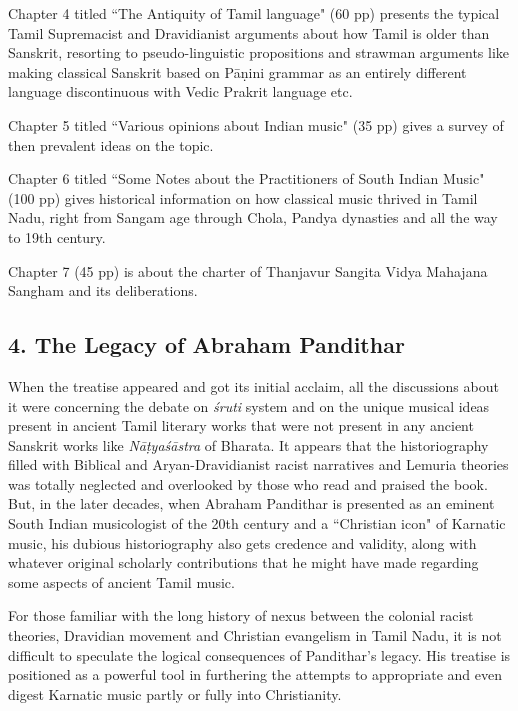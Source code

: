 Chapter 4 titled ``The Antiquity of Tamil language" (60 pp) presents the typical Tamil Supremacist and Dravidianist arguments about how Tamil is older than Sanskrit, resorting to pseudo-linguistic propositions and strawman arguments like making classical Sanskrit based on Pāṇini grammar as an entirely different language discontinuous with Vedic Prakrit language etc.

Chapter 5 titled ``Various opinions about Indian music" (35 pp) gives a survey of then prevalent ideas on the topic.

Chapter 6 titled ``Some Notes about the Practitioners of South Indian Music" (100 pp) gives historical information on how classical music thrived in Tamil Nadu, right from Sangam age through Chola, Pandya dynasties and all the way to 19th century.

Chapter 7 (45 pp) is about the charter of Thanjavur Sangita Vidya Mahajana Sangham and its deliberations.

\vspace{-.3cm}

\subsection*{4. The Legacy of Abraham Pandithar}

\vspace{-.2cm}

When the treatise appeared and got its initial acclaim, all the discussions about it were concerning the debate on \textit{śruti} system and on the unique musical ideas present in ancient Tamil literary works that were not present in any ancient Sanskrit works like \textit{Nāṭ­yaśāstra} of Bharata. It appears that the historiography filled with Biblical and Aryan-Dravidianist racist narratives and Lemuria theories was totally neglected and overlooked by those who read and praised the book. But, in the later decades, when Abraham Pandithar is presented as an eminent South Indian musicologist of the 20th century and a ``Christian icon" of Karnatic music, his dubious historiography also gets credence and validity, along with whatever original scholarly contributions that he might have made regarding some aspects of ancient Tamil music.

For those familiar with the long history of nexus between the colonial racist theories, Dravidian movement and Christian evangelism in Tamil Nadu, it is not difficult to speculate the logical consequences of Pandithar's legacy. His treatise is positioned as a powerful tool in furthering the attempts to appropriate and even digest Karnatic music partly or fully into Christianity.


